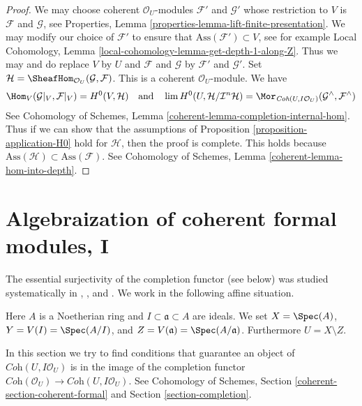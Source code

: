 \begin{proof}
We may choose coherent $\mathcal{O}_U$-modules
$\mathcal{F}'$ and $\mathcal{G}'$ whose restriction to $V$
is $\mathcal{F}$ and $\mathcal{G}$, see
Properties, Lemma \ref{properties-lemma-lift-finite-presentation}.
We may modify our choice of $\mathcal{F}'$ to ensure that
$\text{Ass}(\mathcal{F}') \subset V$, see for example
Local Cohomology, Lemma \ref{local-cohomology-lemma-get-depth-1-along-Z}.
Thus we may and do replace $V$ by $U$ and $\mathcal{F}$ and $\mathcal{G}$
by $\mathcal{F}'$ and $\mathcal{G}'$.
Set $\mathcal{H} = \SheafHom_{\mathcal{O}_U}(\mathcal{G}, \mathcal{F})$.
This is a coherent $\mathcal{O}_U$-module. We have
$$
\Hom_V(\mathcal{G}|_V, \mathcal{F}|_V) =
H^0(V, \mathcal{H})
\quad\text{and}\quad
\lim H^0(U, \mathcal{H}/\mathcal{I}^n\mathcal{H}) =
\Mor_{\textit{Coh}(U, I\mathcal{O}_U)}
(\mathcal{G}^\wedge, \mathcal{F}^\wedge)
$$
See Cohomology of Schemes, Lemma \ref{coherent-lemma-completion-internal-hom}.
Thus if we can show that the assumptions of
Proposition \ref{proposition-application-H0}
hold for $\mathcal{H}$, then the proof is complete.
This holds because
$\text{Ass}(\mathcal{H}) \subset \text{Ass}(\mathcal{F})$.
See Cohomology of Schemes, Lemma
\ref{coherent-lemma-hom-into-depth}.
\end{proof}








\section{Algebraization of coherent formal modules, I}
\label{section-algebraization-modules}

\noindent
The essential surjectivity of the completion functor (see below)
was studied systematically in
\cite{SGA2}, \cite{MRaynaud-book}, and \cite{MRaynaud-paper}.
We work in the following affine situation.

\begin{situation}
\label{situation-algebraize}
Here $A$ is a Noetherian ring and $I \subset \mathfrak a \subset A$ are ideals.
We set $X = \Spec(A)$, $Y = V(I) = \Spec(A/I)$, and
$Z = V(\mathfrak a) = \Spec(A/\mathfrak a)$. Furthermore $U = X \setminus Z$.
\end{situation}

\noindent
In this section we try to find conditions that guarantee an object
of $\textit{Coh}(U, I\mathcal{O}_U)$ is in the image of the completion functor
$\textit{Coh}(\mathcal{O}_U) \to \textit{Coh}(U, I\mathcal{O}_U)$.
See Cohomology of Schemes, Section \ref{coherent-section-coherent-formal} and
Section \ref{section-completion}.

